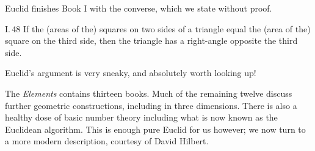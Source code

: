 Euclid finishes Book I with the converse, which we state without proof.

\begin{thm}{I.\,48}{}
	If the (areas of the) squares on two sides of a triangle equal the (area of the) square on the third side, then the  triangle has a right-angle opposite the third side.
\end{thm}

Euclid's argument is very sneaky, and absolutely worth looking up!\bigbreak

The \emph{Elements} contains thirteen books. Much of the remaining twelve discuss further geometric constructions, including in three dimensions. There is also a healthy dose of basic number theory including what is now known as the Euclidean algorithm. This is enough pure Euclid for us however; we now turn to a more modern description, courtesy of David Hilbert.

\clearpage

% 
% 
% 
% 
% 
% 
% 


